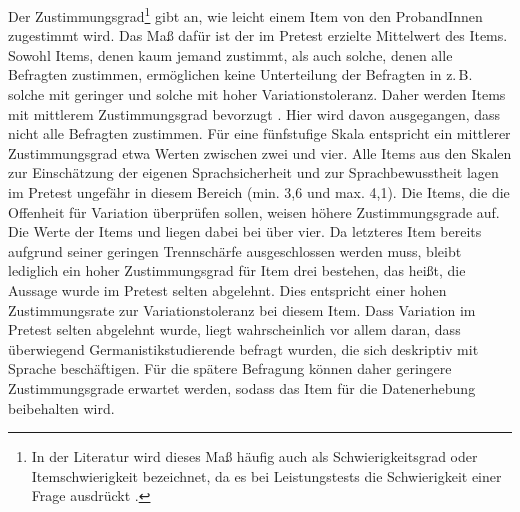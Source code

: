 Der Zustimmungsgrad\footnote{In der Literatur wird dieses Maß häufig auch als Schwierigkeitsgrad oder Itemschwierigkeit bezeichnet, da es bei Leistungstests die Schwierigkeit einer Frage ausdrückt \citep[s.][476]{Doring2016}.} gibt an, wie leicht einem Item von den ProbandInnen zugestimmt wird. Das Maß dafür ist der im Pretest erzielte Mittelwert des Items. 
Sowohl Items, denen kaum jemand zustimmt, als auch solche, denen alle Befragten zustimmen, ermöglichen keine Unterteilung der Befragten in z.\,B. solche mit geringer und solche mit hoher Variationstoleranz. 
Daher werden Items mit mittlerem Zustimmungsgrad bevorzugt \citep[s.][477]{Doring2016}. 
Hier wird davon ausgegangen, dass nicht alle Befragten zustimmen. %
Für eine fünfstufige Skala entspricht ein mittlerer Zustimmungsgrad etwa Werten zwischen zwei und vier. 
Alle Items aus den Skalen zur Einschätzung der eigenen Sprachsicherheit und zur Sprachbewusstheit lagen im Pretest ungefähr in diesem Bereich (min. 3,6 und max. 4,1). 
Die Items, die die Offenheit für Variation überprüfen sollen, weisen höhere Zustimmungsgrade auf. 
Die Werte der Items  und  liegen dabei bei über vier. 
Da letzteres Item bereits aufgrund seiner geringen Trennschärfe ausgeschlossen werden muss, bleibt lediglich ein hoher Zustimmungsgrad für Item drei bestehen, das heißt, die Aussage  wurde im Pretest selten abgelehnt. 
Dies entspricht einer hohen Zustimmungsrate zur Variationstoleranz bei diesem Item. 
Dass Variation im Pretest selten abgelehnt wurde, liegt wahrscheinlich vor allem daran, dass überwiegend Germanistikstudierende befragt wurden, die sich deskriptiv mit Sprache beschäftigen. 
Für die spätere Befragung können daher geringere Zustimmungsgrade erwartet werden, sodass das Item für die Datenerhebung beibehalten wird. %

